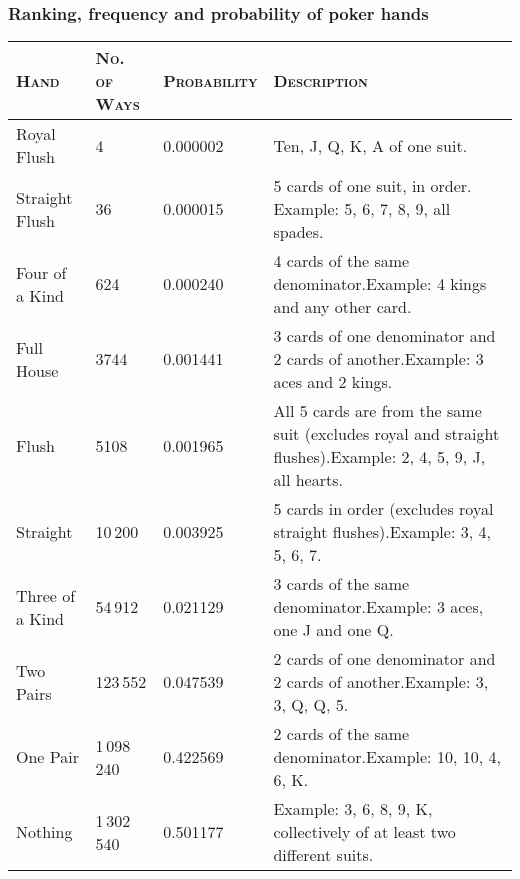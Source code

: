 \documentclass{article}
\begin{document}
\subsubsection*{Ranking, frequency and probability of poker hands}
\begin{tabular}{|l|l|l|p{3in}|}\hline
\textsc{Hand}&\textsc{No. of Ways}&\textsc{Probability}&\textsc{Description}\\\hline\hline
Royal Flush&4&0.000002&Ten, J, Q, K, A of one suit.\\\hline
Straight Flush&36&0.000015&5 cards of one suit, in order.\newline
Example: 5, 6, 7, 8, 9, all spades.\\\hline
Four of a Kind&624&0.000240&4 cards of the same denominator.\newline Example: 4 kings and any other card.\\\hline
Full House&3744&0.001441&3 cards of one denominator and 2 cards of another.\newline Example: 3 aces and 2 kings.\\\hline
Flush&5108&0.001965&All 5 cards are from the same suit (excludes royal and straight flushes).\newline Example: 2, 4, 5, 9, J, all hearts.\\\hline
Straight&10\,200&0.003925&5 cards in order (excludes royal straight flushes).\newline Example: 3, 4, 5, 6, 7.\\\hline
Three of a Kind&54\,912&0.021129&3 cards of the same denominator.\newline Example: 3 aces, one J and one Q.\\\hline
Two Pairs&123\,552&0.047539&2 cards of one denominator and 2 cards of another.\newline Example: 3, 3, Q, Q, 5.\\\hline
One Pair&1\,098\,240&0.422569&2 cards of the same denominator.\newline Example: 10, 10, 4, 6, K.\\\hline
Nothing&1\,302\,540&0.501177&Example: 3, 6, 8, 9, K, collectively of at least two different suits.\\\hline
\end{tabular}
\end{document}
